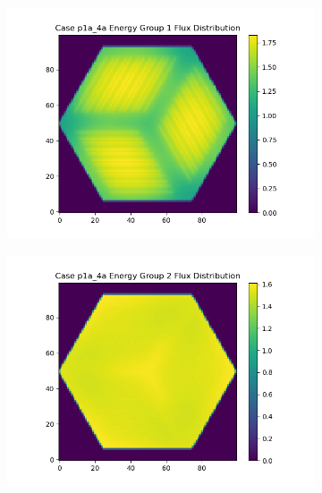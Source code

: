 \documentclass[letterpaper,11pt]{report}
\begin{document}
\begin{figure}[H]
          \begin{subfigure}{.33\textwidth}
            \centering
            \includegraphics[width=1.1\linewidth]{../../phase1a/case4a/analysis_output/p1a_4a_e_eg1.png}
            \caption{}
          \end{subfigure}%
          \begin{subfigure}{.33\textwidth}
            \centering
            \includegraphics[width=1.1\linewidth]{../../phase1a/case4a/analysis_output/p1a_4a_e_eg2.png}
            \caption{}
          \end{subfigure}
          \begin{subfigure}{.33\textwidth}
            \centering

\end{subfigure}
\end{figure}
\end{document}
